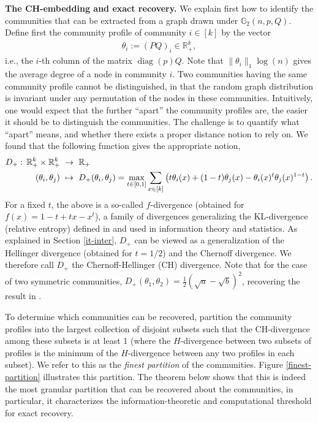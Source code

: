 \documentclass[11pt]{article}
\newcommand{\gs}{\mathbb{G}_2}
\newcommand{\dd}{D_+}
\newcommand{\mR}{\mathbb{R}}
\DeclareMathOperator{\diag}{diag}
\newcommand{\1}{\mathbb{1}}
\begin{document}
 
\noindent
{\bf The CH-embedding and exact recovery.} We explain first how to identify the communities that can be extracted from a graph drawn under $\gs(n,p,Q)$.  Define first the community profile of community $i \in [k]$ by the vector 
\begin{align}
\theta_i:=(PQ)_i \in \mR_+^k,
\end{align} 
i.e., the $i$-th column of the matrix $\diag(p)Q$. Note that $\| \theta_i \|_1 \log(n)$ gives the average degree of a node in community $i$. Two communities having the same community profile cannot be distinguished, in that the random graph distribution is invariant under any permutation of the nodes in these communities. Intuitively, one would expect that the further ``apart'' the community profiles are, the easier it should be to distinguish the communities. The challenge is to quantify what ``apart'' means, and whether there exists a proper distance notion to rely on. We found that the following function gives the appropriate notion, 
\begin{align} 
\dd:\, \mR_+^k \times \mR_+^k &\,\, \to \,\, \mR_+ \notag\\
\phantom{\dd:} (\theta_i, \theta_j) &\,\, \mapsto \,\, \dd(\theta_i, \theta_j) =\max_{t \in [0,1]} \sum_{x \in [k]} \left( t\theta_i(x) + (1-t)\theta_j(x)- \theta_i(x)^t \theta_j(x)^{1-t} \right). \label{h-div1}
\end{align}
For a fixed $t$, the above is a so-called $f$-divergence (obtained for $f(x)=1-t+tx-x^t$), a family of divergences generalizing the KL-divergence (relative entropy) defined in \cite{csiszar-f,morimoto,ali} and used in information theory and statistics. As explained in Section \ref{it-inter}, $\dd$ can be viewed as a generalization of the Hellinger divergence (obtained for $t=1/2$) and the Chernoff divergence. We therefore call $\dd$ the Chernoff-Hellinger (CH) divergence.  Note that for the case of two symmetric communities, $\dd(\theta_1,\theta_2)=\frac{1}{2}(\sqrt{a}-\sqrt{b})^2$, recovering the result in \cite{abh,mossel-consist}.


To determine which communities can be recovered, partition the community profiles into the largest collection of disjoint subsets such that the CH-divergence among these subsets is at least 1 (where the $H$-divergence between two subsets of profiles is the minimum of the $H$-divergence between any two profiles in each subset). We refer to this as the {\it finest partition} of the communities. Figure \ref{finest-partition} illustrates this partition. The theorem below shows that this is indeed the most granular partition that can be recovered about the communities, in particular, it characterizes the information-theoretic and computational threshold for exact recovery. 
\end{document}

